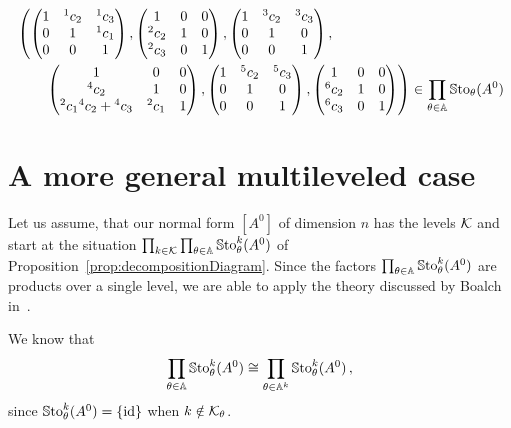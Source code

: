 \begin{align*}
  &\left(
    \begin{pmatrix} 1 & {}^1c_2 & {}^1c_3 \\0 & 1 & {}^1c_1 \\0 & 0 & 1 \end{pmatrix},
    \begin{pmatrix} 1 & 0 & 0 \\{}^2c_2 & 1 & 0 \\{}^2c_3 & 0 & 1 \end{pmatrix},
    \begin{pmatrix} 1 & {}^3c_2 & {}^3c_3 \\0 & 1 & 0 \\0 & 0 & 1 \end{pmatrix},
  \right.
\\&\qquad
  \left.
    \begin{pmatrix} 1 & 0 & 0 \\{}^4c_2 & 1 & 0 \\{}^2c_1{}^4c_2+{}^4c_3 & {}^2c_1 & 1 \end{pmatrix},
    \begin{pmatrix} 1 & {}^5c_2 & {}^5c_3 \\0 & 1 & 0 \\0 & 0 & 1 \end{pmatrix},
    \begin{pmatrix} 1 & 0 & 0 \\{}^{6}c_2 & 1 & 0 \\{}^{6}c_3 & 0 & 1 \end{pmatrix}
  \right)
  \in
  \prod_{\theta\in\mathbb{A}}\operatorname{\mathbb{S}to}_{\theta}(A^0)
\end{align*}

\section{A more general multileveled case}
Let us assume, that our normal form $[A^0]$ of dimension $n$ has the levels
$\mathcal{K}$ and start at the situation
$\prod_{k\in\mathcal{K}}\prod_{\theta\in\mathbb{A}}\operatorname{\mathbb{S}to}_{\theta}^{k}(A^0)$
of Proposition~\ref{prop:decompositionDiagram}.
Since the factors $\prod_{\theta\in\mathbb{A}}\operatorname{\mathbb{S}to}_{\theta}^{k}(A^0)$ are products
over a single level, we are able to apply the theory discussed by Boalch
in~\cite[Section 3]{boalch}.

We know that
\[
  \prod_{\theta\in\mathbb{A}}\operatorname{\mathbb{S}to}_{\theta}^{k}(A^0)\cong
  \prod_{\theta\in\mathbb{A}^k}\operatorname{\mathbb{S}to}_{\theta}^{k}(A^0) \,,
\]
since $\operatorname{\mathbb{S}to}_{\theta}^{k}(A^0)=\{\operatorname{id}\}$ when $k\notin\mathcal{K}_\theta$.


